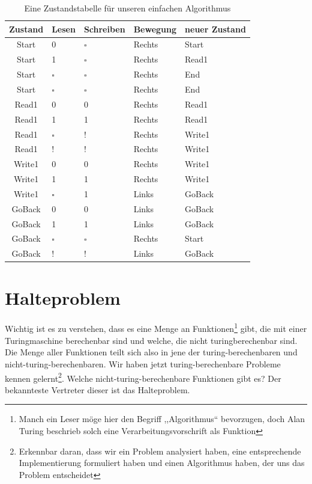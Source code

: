 \begin{table}
 \begin{center}
  \begin{tabular}{cllll}
   \hline
    Zustand & Lesen     & Schreiben & Bewegung & neuer Zustand \\
   \hline \hline
    Start   & 0         & $\square$ & Rechts   & Start \\
    Start   & 1         & $\square$ & Rechts   & Read1 \\
    Start   & $\square$ & $\square$ & Rechts   & End \\
    Start   & $\square$ & $\square$ & Rechts   & End \\
    Read1   & 0         & 0         & Rechts   & Read1 \\
    Read1   & 1         & 1         & Rechts   & Read1 \\
    Read1   & $\square$ & !         & Rechts   & Write1 \\
    Read1   & !         & !         & Rechts   & Write1 \\
    Write1  & 0         & 0         & Rechts   & Write1 \\
    Write1  & 1         & 1         & Rechts   & Write1 \\
    Write1  & $\square$ & 1         & Links    & GoBack \\
    GoBack  & 0         & 0         & Links    & GoBack \\
    GoBack  & 1         & 1         & Links    & GoBack \\
    GoBack  & $\square$ & $\square$ & Rechts   & Start \\
    GoBack  & !         & !         & Links    & GoBack \\
   \hline
  \end{tabular}
  \caption{Eine Zustandstabelle für unseren einfachen Algorithmus}
  \label{tab:simple_tm_algo}
 \end{center}
\end{table}
%
\section{Halteproblem}
%
Wichtig ist es zu verstehen, dass es eine Menge an Funktionen\footnote{Manch ein Leser möge hier den Begriff ,,Algorithmus`` bevorzugen, doch Alan Turing beschrieb solch eine Verarbeitungsvorschrift als Funktion} gibt, die mit einer Turingmaschine berechenbar sind und welche, die nicht turingberechenbar sind. Die Menge aller Funktionen teilt sich also in jene der turing-berechenbaren und nicht-turing-berechenbaren. Wir haben jetzt turing-berechenbare Probleme kennen gelernt\footnote{Erkennbar daran, dass wir ein Problem analysiert haben, eine entsprechende Implementierung formuliert haben und einen Algorithmus haben, der uns das Problem entscheidet}. Welche nicht-turing-berechenbare Funktionen gibt es? Der bekannteste Vertreter dieser ist das Halteproblem.

